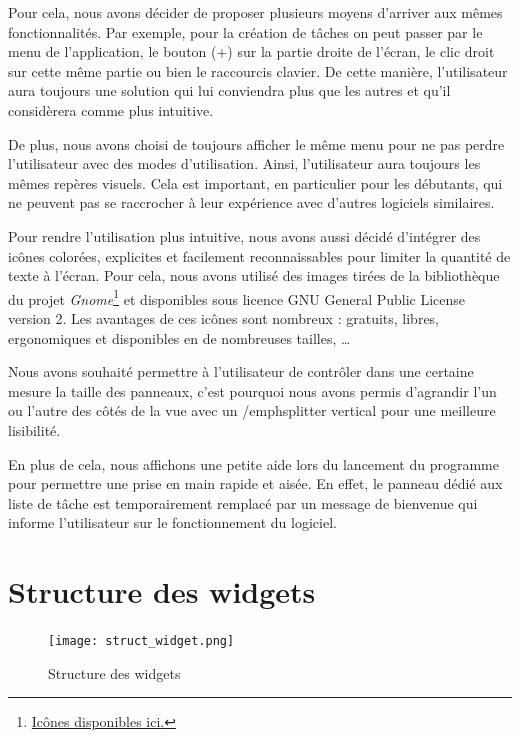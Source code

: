 		Pour cela, nous avons décider de proposer plusieurs moyens d'arriver aux mêmes fonctionnalités. Par exemple, pour la création de tâches on peut passer par le menu de l'application, le bouton (+) sur la partie droite de l'écran, le clic droit sur cette même partie ou bien le raccourcis clavier. De cette manière, l'utilisateur aura toujours une solution qui lui conviendra plus que les autres et qu'il considèrera comme plus intuitive.
		
		De plus, nous avons choisi de toujours afficher le même menu pour ne pas perdre l'utilisateur avec des \og modes \fg d'utilisation. Ainsi, l'utilisateur aura toujours les mêmes repères visuels. Cela est important, en particulier pour les débutants, qui ne peuvent pas se raccrocher à leur expérience avec d'autres logiciels similaires.\newline
		
		Pour rendre l'utilisation plus intuitive, nous avons aussi décidé d'intégrer des icônes colorées, explicites et facilement reconnaissables pour limiter la quantité de texte à l'écran. Pour cela, nous avons utilisé des images tirées de la bibliothèque du projet \emph{Gnome}\footnote{\href{https://commons.wikimedia.org/wiki/GNOME_Desktop_icons}{Icônes disponibles ici.}} et disponibles sous licence GNU General Public License version 2. Les avantages de ces icônes sont nombreux : gratuits, libres, ergonomiques et disponibles en de nombreuses tailles, \dots \newline
		
		Nous avons souhaité permettre à l'utilisateur de contrôler dans une certaine mesure la taille des panneaux, c'est pourquoi nous avons permis d'agrandir l'un ou l'autre des côtés de la vue avec un /emph{splitter} vertical pour une meilleure lisibilité.
		
		En plus de cela, nous affichons une petite aide lors du lancement du programme pour permettre une prise en main rapide et aisée. En effet, le panneau dédié aux liste de tâche est temporairement remplacé par un message de bienvenue qui informe l'utilisateur sur le fonctionnement du logiciel.
		
		
	\section{Structure des widgets}
	
		\begin{figure}[h!]
			\centering
		   \texttt{[image: struct\_widget.png]}
		   \caption{Structure des widgets}
		\end{figure}
		\FloatBarrier
		
